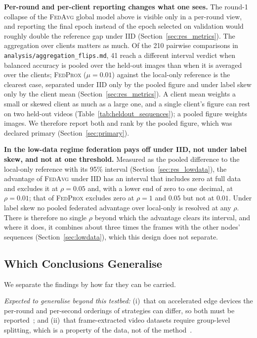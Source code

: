 \documentclass[journal]{IEEEtran}
\newcommand{\fedavg}{\textsc{FedAvg}}
\newcommand{\fedprox}{\textsc{FedProx}}
\begin{document}
\textbf{Per-round and per-client reporting changes what one sees.} The round-1 collapse of the \fedavg{} global model above is visible only in a per-round view, and reporting the final epoch instead of the epoch selected on validation would roughly double the reference gap under IID (Section~\ref{sec:res_metrics}). The aggregation over clients matters as much. Of the 210 pairwise comparisons in \texttt{analysis/aggregation\_flips.md}, 41 reach a different interval verdict when balanced accuracy is pooled over the held-out images than when it is averaged over the clients; \fedprox{} ($\mu=0.01$) against the local-only reference is the clearest case, separated under IID only by the pooled figure and under label skew only by the client mean (Section~\ref{sec:res_metrics}). A client mean weights a small or skewed client as much as a large one, and a single client's figure can rest on two held-out videos (Table~\ref{tab:heldout_sequences}); a pooled figure weights images. We therefore report both and rank by the pooled figure, which was declared primary (Section~\ref{sec:primary}).

\textbf{In the low-data regime federation pays off under IID, not under label skew, and not at one threshold.} Measured as the pooled difference to the local-only reference with its 95\% interval (Section~\ref{sec:res_lowdata}), the advantage of \fedavg{} under IID has an interval that includes zero at full data and excludes it at $\rho=0.05$ and, with a lower end of zero to one decimal, at $\rho=0.01$; that of \fedprox{} excludes zero at $\rho=1$ and $0.05$ but not at $0.01$. Under label skew no pooled federated advantage over local-only is resolved at any $\rho$. There is therefore no single $\rho$ beyond which the advantage clears its interval, and where it does, it combines about three times the frames with the other nodes' sequences (Section~\ref{sec:lowdata}), which this design does not separate.

\subsection{Which Conclusions Generalise}
\label{sec:generalise}

We separate the findings by how far they can be carried.

\emph{Expected to generalise beyond this testbed:} (i)~that on accelerated edge devices the per-round and per-second orderings of strategies can differ, so both must be reported~\cite{banerjee2025fedjoule, prashanthi2022jetson}; and (ii)~that frame-extracted video datasets require group-level splitting, which is a property of the data, not of the method~\cite{barz2020duplicates}.
\end{document}
